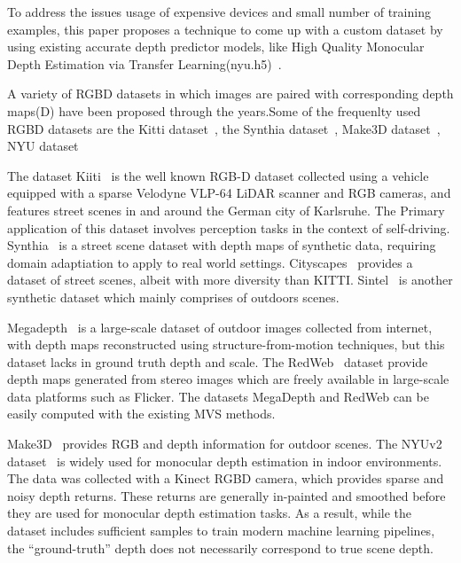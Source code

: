 \documentclass[review]{cvpr}
\begin{document}
To address the issues usage of expensive devices and small number of training examples, this paper proposes a technique to come up with a custom dataset by using existing accurate depth predictor models, like High Quality Monocular Depth Estimation via Transfer Learning(nyu.h5)~\cite{alhashim2018high}. 

A variety of RGBD datasets in which images are paired with corresponding depth maps(D) have been proposed through the years.Some of the frequenlty used RGBD datasets are the Kitti dataset~\cite{geiger2013vision}, the Synthia dataset~\cite{ros2016synthia}, Make3D dataset~\cite{saxena2008make3d}, NYU dataset~\cite{silberman2012indoor}

The dataset Kiiti~\cite{geiger2013vision} is the well known RGB-D dataset collected using a vehicle equipped with a sparse Velodyne VLP-64 LiDAR scanner and RGB cameras, and features street scenes in and around the German city of Karlsruhe. The Primary application of this dataset involves perception tasks in the context of self-driving. Synthia~\cite{ros2016synthia} is a street scene dataset with depth maps of synthetic data, requiring domain adaptiation to apply to real world settings. Cityscapes~\cite{cordts2016cityscapes} provides a dataset of street scenes, albeit with more diversity than KITTI. Sintel~\cite{mayer2016large} is another synthetic dataset which mainly comprises of outdoors scenes.

Megadepth~\cite{li2018megadepth} is a large-scale dataset of outdoor images collected from internet, with depth maps reconstructed using structure-from-motion techniques, but this dataset lacks in ground truth depth and scale. The RedWeb~\cite{xian2018monocular} dataset provide depth maps generated from stereo images which are freely available in large-scale data platforms such as Flicker. The datasets MegaDepth and RedWeb can be easily computed with the existing MVS methods.

Make3D~\cite{saxena2008make3d} provides RGB and depth information for outdoor scenes. The NYUv2 dataset~\cite{silberman2012indoor} is widely used for monocular depth estimation in indoor environments. The data was collected with a Kinect RGBD camera, which provides sparse and noisy depth returns. These returns are generally in-painted and smoothed before they are used for monocular depth estimation tasks. As a result, while the dataset includes sufficient samples to train modern machine learning pipelines, the “ground-truth” depth does not necessarily correspond to true scene depth.
\end{document}
